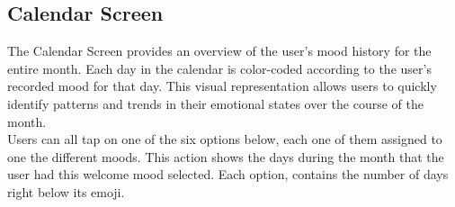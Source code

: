 \vspace{5mm}

\subsection{Calendar Screen}

The Calendar Screen provides an overview of the user's mood history for the entire month. Each day in the calendar is color-coded according to the user's recorded mood for that day. This visual representation allows users to quickly identify patterns and trends in their emotional states over the course of the month.\vspace{5mm} \\
Users can all tap on one of the six options below, each one of them assigned to one the different moods. This action shows the days during the month that the user had this welcome mood selected. Each option, contains the number of days right below its emoji.

\vspace{5mm}

